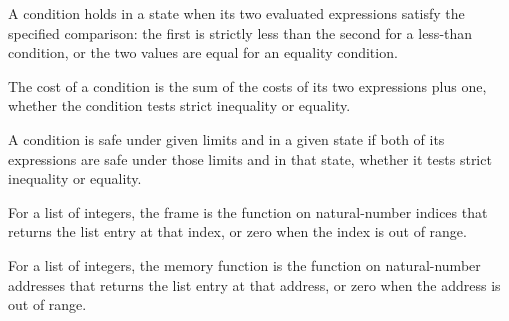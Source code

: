 \begin{definition}
\label{Light.Cond.Holds}
\leanok
{}
A condition holds in a state when its two evaluated expressions satisfy the specified
comparison: the first is strictly less than the second for a less-than condition, or the
two values are equal for an equality condition.
\end{definition}

\begin{definition}
\label{Light.Cond.cost}
\leanok
{}
The cost of a condition is the sum of the costs of its two expressions plus one, whether
the condition tests strict inequality or equality.
\end{definition}

\begin{definition}
\label{Light.Cond.Safe}
\leanok
{}
A condition is safe under given limits and in a given state if both of its expressions
are safe under those limits and in that state, whether it tests strict inequality or
equality.
\end{definition}

\begin{definition}
\label{Light.frame}
\leanok
For a list of integers, the frame is the function on natural-number indices that returns
the list entry at that index, or zero when the index is out of range.
\end{definition}

\begin{definition}
\label{Light.memOf}
\leanok
For a list of integers, the memory function is the function on natural-number addresses
that returns the list entry at that address, or zero when the address is out of range.
\end{definition}

